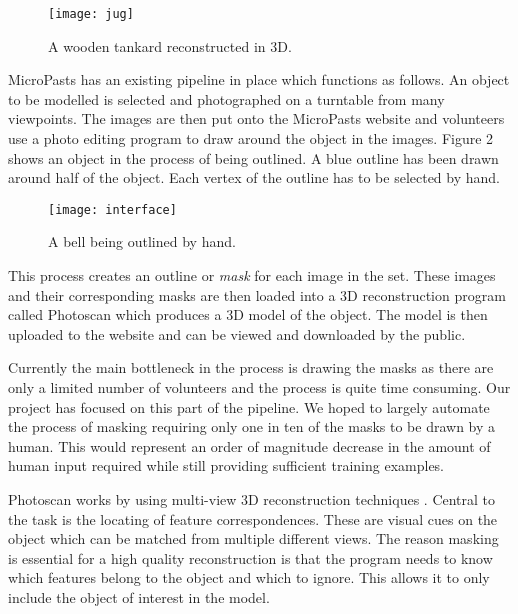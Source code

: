\documentclass[12pt]{IIBproject}
\begin{document}
\begin{figure}[H]
  \caption{A wooden tankard reconstructed in 3D.}
  \centering
    \texttt{[image: jug]}
\end{figure}

 MicroPasts has an existing pipeline in place which functions as follows. An object to be modelled is selected and photographed on a turntable from many viewpoints. The images are then put onto the MicroPasts website and volunteers use a photo editing program to draw around the object in the images. Figure 2 shows an object in the process of being outlined. A blue outline has been drawn around half of the object. Each vertex of the outline has to be selected by hand.
\begin{figure}[H]
  \caption{A bell being outlined by hand.}
  \centering
    \texttt{[image: interface]}
\end{figure} 
  This process creates an outline or \emph{mask} for each image in the set. These images and their corresponding masks are then loaded into a 3D reconstruction program called Photoscan\cite{photoscan} which produces a 3D model of the object. The model is then uploaded to the website and can be viewed and downloaded by the public. 

Currently the main bottleneck in the process is drawing the masks as there are only a limited number of volunteers and the process is quite time consuming. Our project has focused on this part of the pipeline. We hoped to largely automate the process of masking requiring only one in ten of the masks to be drawn by a human. This would represent an order of magnitude decrease in the amount of human input required while still providing sufficient training examples. 

Photoscan works by using multi-view 3D reconstruction techniques \cite{Hartley2004}. Central to the task is the locating of feature correspondences. These are visual cues on the object which can be matched from multiple different views. The reason masking is essential for a high quality reconstruction is that the program needs to know which features belong to the object and which to ignore. This allows it to only include the object of interest in the model.
\end{document}
